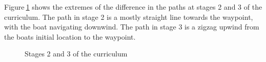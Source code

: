 Figure$~$\ref{curriculum} shows the extremes of the difference in the paths at stages 2 and 3 of the curriculum. The path in stage 2 is a mostly straight line towards the waypoint, with the boat navigating downwind. The path in stage 3 is a zigzag upwind from the boats initial location to the waypoint. 

\begin{figure}
    \centering
    \caption{Stages 2 and 3 of the curriculum}\label{curriculum}
\end{figure}

